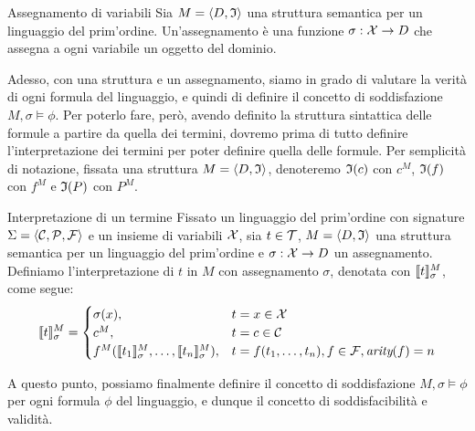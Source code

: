 \begin{definition}{Assegnamento di variabili}
  Sia \(M = \langle D, \mathfrak{I} \rangle\) una struttura semantica per un linguaggio del prim'ordine. Un'assegnamento è una funzione \(\sigma: \mathcal{X}\to D\) che assegna a ogni variabile un oggetto del dominio.
\end{definition}

Adesso, con una struttura e un assegnamento, siamo in grado di valutare la verità di ogni formula del linguaggio, e quindi di definire il concetto di soddisfazione \(M,\sigma\models \phi\). Per poterlo fare, però, avendo definito la struttura sintattica delle formule a partire da quella dei termini, dovremo prima di tutto definire l'interpretazione dei termini per poter definire quella delle formule. Per semplicità di notazione, fissata una struttura \(M=\langle D,\mathfrak{I}\rangle\), denoteremo \(\mathfrak{I}(c)\) con \(c^M\), \(\mathfrak{I}(f)\) con \(f^M\) e \(\mathfrak{I}(P)\) con \(P^M\).

\begin{definition}{Interpretazione di un termine}
  Fissato un linguaggio del prim'ordine con signature \(\Sigma = \langle \mathcal{C}, \mathcal{P}, \mathcal{F} \rangle\) e un insieme di variabili \(\mathcal{X}\),
  sia \(t\in \mathcal{T}\), \(M = \langle D, \mathfrak{I} \rangle\) una struttura semantica per un linguaggio del prim'ordine e \(\sigma: \mathcal{X}\to D\) un assegnamento. Definiamo l'interpretazione di \(t\) in \(M\) con assegnamento \(\sigma\), denotata con \(\den{t}[M][\sigma]\), come segue:
  \[\den{t}[M][\sigma] = \begin{cases}
    \sigma(x), & t = x\in\VarSyms\\
    c^M, & t = c\in\ConstSyms\\
    f^M(\den{t_1}[M][\sigma], \ldots, \den{t_n}[M][\sigma]), & t = f(t_1,\ldots,t_n), f\in\FuncSyms, \arty(f)=n
  \end{cases}\]
\end{definition}

A questo punto, possiamo finalmente definire il concetto di soddisfazione \(M,\sigma\models \phi\) per ogni formula \(\phi\) del linguaggio, e dunque il concetto di soddisfacibilità e validità.

